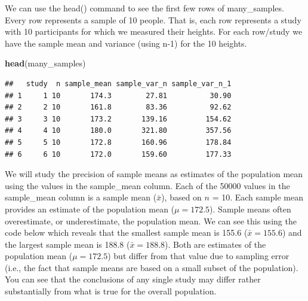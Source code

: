 \documentclass[
]{krantz}
\makeatletter
\newenvironment{Shaded}{\begin{snugshade}}{\end{snugshade}}
\newcommand{\DataTypeTok}[1]{\textcolor[rgb]{0.27,0.27,0.27}{#1}}
\newcommand{\KeywordTok}[1]{\textcolor[rgb]{0.27,0.27,0.27}{\textbf{#1}}}
\newcommand{\NormalTok}[1]{#1}
\newcommand{\OperatorTok}[1]{\textcolor[rgb]{0.43,0.43,0.43}{\textbf{#1}}}
\newcommand{\StringTok}[1]{\textcolor[rgb]{0.5,0.5,0.5}{#1}}
\newenvironment{kframe}{%
\medskip{}
\setlength{\fboxsep}{.8em}
 \def\at@end@of@kframe{}%
 \ifinner\ifhmode%
  \def\at@end@of@kframe{\end{minipage}}%
  \begin{minipage}{\columnwidth}%
 \fi\fi%
 \def\FrameCommand##1{\hskip\@totalleftmargin \hskip-\fboxsep
 \colorbox{shadecolor}{##1}\hskip-\fboxsep
     \hskip-\linewidth \hskip-\@totalleftmargin \hskip\columnwidth}%
 \MakeFramed {\advance\hsize-\width
   \@totalleftmargin\z@ \linewidth\hsize
   \@setminipage}}%
 {\par\unskip\endMakeFramed%
 \at@end@of@kframe}
\renewenvironment{Shaded}{\begin{kframe}}{\end{kframe}}
\makeatother
\begin{document}
We can use the head() command to see the first few rows of many\_samples. Every row represents a sample of 10 people. That is, each row represents a study with 10 participants for which we measured their heights. For each row/study we have the sample mean and variance (using n-1) for the 10 heights.

\begin{Shaded}
\begin{Highlighting}[]
\KeywordTok{head}\NormalTok{(many_samples)}
\end{Highlighting}
\end{Shaded}

\begin{verbatim}
##   study  n sample_mean sample_var_n sample_var_n_1
## 1     1 10       174.3        27.81          30.90
## 2     2 10       161.8        83.36          92.62
## 3     3 10       173.2       139.16         154.62
## 4     4 10       180.0       321.80         357.56
## 5     5 10       172.8       160.96         178.84
## 6     6 10       172.0       159.60         177.33
\end{verbatim}

We will study the precision of sample means as estimates of the population mean using the values in the sample\_mean column. Each of the 50000 values in the sample\_mean column is a sample mean (\(\bar{x}\)), based on \(n\) = 10. Each sample mean provides an estimate of the population mean (\(\mu = 172.5\)). Sample means often overestimate, or underestimate, the population mean. We can see this using the code below which reveals that the smallest sample mean is 155.6 (\(\bar{x} = 155.6\)) and the largest sample mean is 188.8 (\(\bar{x} = 188.8\)). Both are estimates of the population mean (\(\mu = 172.5\)) but differ from that value due to sampling error (i.e., the fact that sample means are based on a small subset of the population). You can see that the conclusions of any single study may differ rather substantially from what is true for the overall population.

\begin{Shaded}
\end{Shaded}
\end{document}
